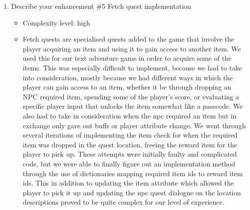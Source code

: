 \documentclass[11pt]{article}
\begin{document}
\begin{enumerate}
\item Describe your enhancement \#5 Fetch quest implementation
	\begin{itemize}
	\item Complexity level: high
    \item Fetch quests are specialised quests added to the game that involve the player acquiring an item and using it to gain access to another item. We used this for our text adventure game in order to acquire some of the items. This was especially difficult to implement, because we had to take into consideration, mostly because we had different ways in which the player can gain access to an item, whether it be through dropping an NPC required item, spending some of the player’s score, or evaluating a specific player input that unlocks the item somewhat like a passcode. We also had to take in consideration when the npc required an item but in exchange only gave out buffs or player attribute change. We went through several iterations of implementing the item check for when the required item was dropped in the quest location, freeing the reward item for the player to pick up. These attempts were initially faulty and complicated code, but we were able to finally figure out an implementation method through the use of dictionaries mapping required item ids to reward item ids. This in addition to updating the item attribute which allowed the player to pick it up and updating the npc quest dialogue on the location descriptions proved to be quite complex for our level of experience.
	\end{itemize}

\end{enumerate}
\end{document}
